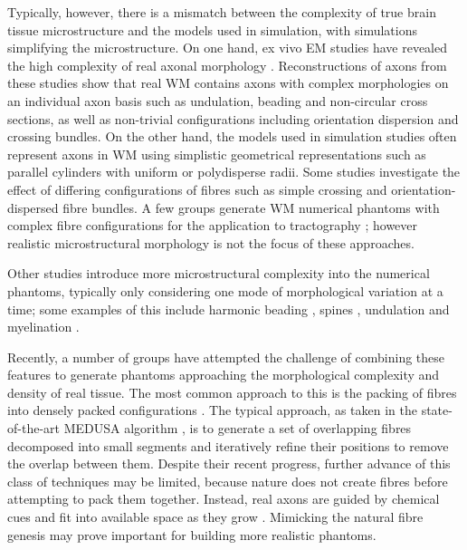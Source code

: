 Typically, however, there is a mismatch between the complexity of true brain tissue microstructure and the models used in simulation, with simulations simplifying the microstructure.
On one hand, ex vivo \ac{EM} studies have revealed the high complexity of real axonal morphology \cite{Abdollahzadeh2019,Lee2019b,Salo2018}.
Reconstructions of axons from these studies show that real \ac{WM} contains axons with complex morphologies on an individual axon basis such as undulation, beading and non-circular cross sections, as well as non-trivial configurations including orientation dispersion and crossing bundles.
On the other hand, the models used in simulation studies often represent axons in \ac{WM} using simplistic geometrical representations such as parallel cylinders with uniform \cite{Fieremans2010,Nilsson2010,Nilsson2009,Ford1997} or polydisperse \cite{Alexander2010,Hall2009} radii.
Some studies investigate the effect of differing configurations of fibres such as simple crossing \cite{Rensonnet2017,Zhang2011a} and orientation-dispersed \cite{Tariq2016,Zhang2012,Zhang2011} fibre bundles.
A few groups generate \ac{WM} numerical phantoms with complex fibre configurations for the application to  tractography \cite{Close2009,Neher2014}; however realistic microstructural morphology is not the focus of these approaches.

Other studies introduce more microstructural complexity into the numerical phantoms, typically only considering one mode of morphological variation at a time; some examples of this include harmonic beading \cite{Budde2010,Landman2010}, spines \cite{Palombo2018}, undulation \cite{Brabec2019,Nilsson2012} and myelination \cite{Brusini2019}.


Recently, a number of groups have attempted the challenge of combining these features to generate phantoms approaching the morphological complexity and density of real tissue.
The most common approach to this is the packing of fibres into densely packed configurations \cite{Close2009,Ginsburger2018,Ginsburger2019,Rafael-Patino2018}.
The typical approach, as taken in the state-of-the-art MEDUSA algorithm \cite{Ginsburger2019}, is to generate a set of overlapping fibres decomposed into small segments and iteratively refine their positions to remove the overlap between them.
Despite their recent progress, further advance of this class of techniques may be limited, because nature does not create fibres before attempting to pack them together.
Instead, real axons are guided by chemical cues and fit into available space as they grow \cite{Price2017,Lowery2009}.
Mimicking the natural fibre genesis may prove important for building more realistic phantoms.

